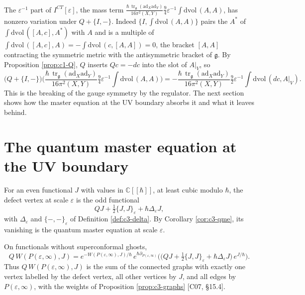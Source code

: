 \begin{remark}
\label{rem:c4-epsinv}
The $\varepsilon^{-1}$ part of $I^{CT}[\varepsilon]$, the mass term $\frac{\hbar\,\operatorname{tr}_{\mathfrak g}(\mathrm{ad}_X\mathrm{ad}_Y)}{16\pi^2(X,Y)}\tfrac94\varepsilon^{-1}\int\mathrm{dvol}\,(A,A)$, has nonzero variation under $Q+\{I,-\}$. Indeed $\{I,\int\mathrm{dvol}\,(A,A)\}$ pairs the $A^*$ of $\int\mathrm{dvol}\,([A,c],A^*)$ with $A$ and is a multiple of $\int\mathrm{dvol}\,([A,c],A)=-\int\mathrm{dvol}\,(c,[A,A])=0$, the bracket $[A,A]$ contracting the symmetric metric with the antisymmetric bracket of $\mathfrak g$. By Proposition \ref{prop:c1-Q}, $Q$ inserts $Qc=-dc$ into the slot of $A|_V$, so
\[
\big(Q+\{I,-\}\big)\Big(\frac{\hbar\,\operatorname{tr}_{\mathfrak g}(\mathrm{ad}_X\mathrm{ad}_Y)}{16\pi^2(X,Y)}\tfrac94\varepsilon^{-1}\int\mathrm{dvol}\,(A,A)\Big)=-\frac{\hbar\,\operatorname{tr}_{\mathfrak g}(\mathrm{ad}_X\mathrm{ad}_Y)}{16\pi^2(X,Y)}\tfrac92\varepsilon^{-1}\int\mathrm{dvol}\,(dc,A|_V).
\]
This is the breaking of the gauge symmetry by the regulator. The next section shows how the master equation at the UV boundary absorbs it and what it leaves behind.
\end{remark}

\section{The quantum master equation at the UV boundary}

\begin{definition}
\label{def:c4-defect}
For an even functional $J$ with values in $\mathbb C[[\hbar]]$, at least cubic modulo $\hbar$, the defect vertex at scale $\varepsilon$ is the odd functional
\[
QJ+\tfrac12\{J,J\}_\varepsilon+\hbar\Delta_\varepsilon J,
\]
with $\Delta_\varepsilon$ and $\{-,-\}_\varepsilon$ of Definition \ref{def:c3-delta}. By Corollary \ref{cor:c3-qme}, its vanishing is the quantum master equation at scale $\varepsilon$.
\end{definition}

\begin{proposition}
\label{prop:c4-defectflow}
On functionals without superconformal ghosts,
\begin{equation}
Q\,W(P(\varepsilon,\infty),J)=e^{-W(P(\varepsilon,\infty),J)/\hbar}\,e^{\hbar\partial_{P(\varepsilon,\infty)}}\Big(\big(QJ+\tfrac12\{J,J\}_\varepsilon+\hbar\Delta_\varepsilon J\big)\,e^{J/\hbar}\Big).
\label{eq:c4-defectflow}
\end{equation}
Thus $Q\,W(P(\varepsilon,\infty),J)$ is the sum of the connected graphs with exactly one vertex labelled by the defect vertex, all other vertices by $J$, and all edges by $P(\varepsilon,\infty)$, with the weights of Proposition \ref{prop:c3-graphs} [C07, §15.4].
\end{proposition}

